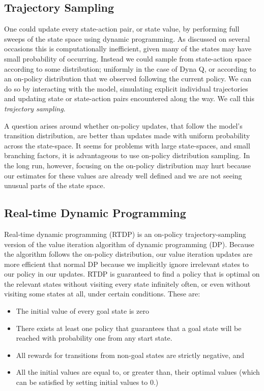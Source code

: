 \subsection{Trajectory Sampling}
One could update every state-action pair, or state value, by performing full sweeps of the state space using dynamic programming. As discussed on several occasions this is computationally inefficient, given many of the states may have small probability of occurring. Instead we could sample from state-action space according to some distribution; uniformly in the case of Dyna Q, or according to an on-policy distribution that we observed following the current policy. We can do so by interacting with the model, simulating explicit individual trajectories and updating state or state-action pairs encountered along the way. We call this \textit{trajectory sampling}.

A question arises around whether on-policy updates, that follow the model's transition distribution, are better than updates made with uniform probability across the state-space. It seems for problems with large state-spaces, and small branching factors, it is advantageous to use on-policy distribution sampling. In the long run, however, focusing on the on-policy distribution may hurt because our estimates for these values are already well defined and we are not seeing unusual parts of the state space.

\subsection{Real-time Dynamic Programming}
Real-time dynamic programming (RTDP) is an on-policy trajectory-sampling version of the value iteration algorithm of dynamic programming (DP). Because the algorithm follows the on-policy distribution, our value iteration updates are more efficient that normal DP because we implicitly ignore irrelevant states to our policy in our updates. RTDP is guaranteed to find a policy that is optimal on the relevant states without visiting every state infinitely often, or even without visiting some states at all, under certain conditions. These are:
\begin{itemize}
	\item The initial value of every goal state is zero
	\item There exists at least one policy that guarantees that a goal state will be reached with probability one from any start state.
	\item All rewards for transitions from non-goal states are strictly negative, and
	\item All the initial values are equal to, or greater than, their optimal values (which can be satisfied by setting initial values to 0.)
\end{itemize}

